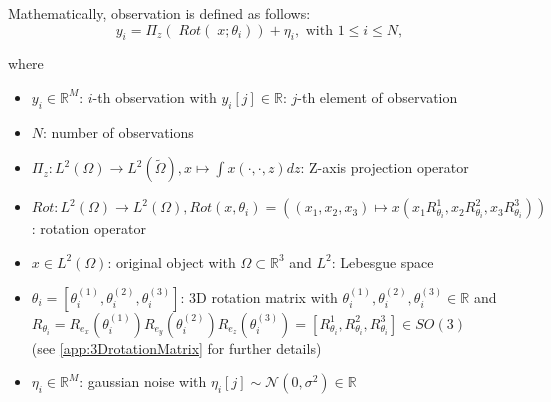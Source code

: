 Mathematically, observation is defined as follows:
\begin{equation}
    \label{eq:cryoEmSimple}
    y_i = \Pi_z  (\; Rot (\;x; \theta_i )) + \eta_i, \text{ with } 1 \leq i \leq N,
\end{equation}

where 
\begin{itemize}
    \item $y_i \in \mathbb{R}^M$:  $i$-th observation with $y_i[j] \in \mathbb{R}$: $j$-th element of observation
    \item $N$: number of observations
    \item $\Pi_z : L^2(\Omega) \to L^2(\tilde{\Omega}), x \mapsto  \int x(\cdot,\cdot,z) dz$: Z-axis projection operator
    \item $Rot : L^2(\Omega) \to L^2(\Omega), Rot(x, \theta_i) = \left((x_1,x_2,x_3) \mapsto x( x_1R^1_{\theta_i}, x_2R^2_{\theta_i}, x_3R^3_{\theta_i})\right)$: rotation operator
    \item $x \in L^2(\Omega)$: original object with $\Omega \subset \mathbb{R}^3 $ and $L^2$: Lebesgue space
    \item  $\theta_i = [\theta_i^{(1)}, \theta_i^{(2)}, \theta_i^{(3)} ] $: 3D rotation matrix with $ \theta_i^{(1)}, \theta_i^{(2)}, \theta_i^{(3)} \in \mathbb{R}$ and \\
        $R_{\theta_i} =  R_{e_x} (\theta_i^{(1)}) R_{e_y} (\theta_i^{(2)}) R_{e_z} (\theta_i^{(3)}) = [R^1_{\theta_i}, R^2_{\theta_i}, R^3_{\theta_i}] \in SO(3)$ \\
        (see \ref{app:3DrotationMatrix} for further details)
    \item $\eta_i \in \mathbb{R}^M$: gaussian noise with $\eta_i[j] \sim \mathcal{N}(0,\sigma^2) \in \mathbb{R}$
\end{itemize}




